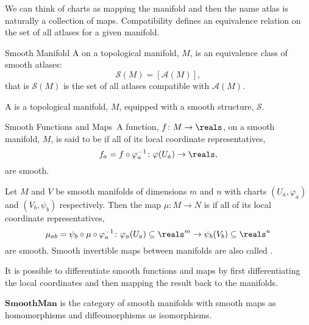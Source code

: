 \documentclass[fleqn]{NotesClass}
\newcommand*{\category}[1]{\mathbf{#1}}
\begin{document}
    We can think of charts as mapping the manifold and then the name atlas is naturally a collection of maps.
    Compatibility defines an equivalence relation on the set of all atlases for a given manifold.
    
    \begin{dfn}{Smooth Manifold}{}
        A  on a topological manifold, \(M\), is an equivalence class of smooth atlases:
        \begin{equation}
            \mathcal{S}(M) = [\mathcal{A}(M)],
        \end{equation}
        that is \(\mathcal{S}(M)\) is the set of all atlases compatible with \(\mathcal{A}(M)\).
        
        A  is a topological manifold, \(M\), equipped with a smooth structure, \(\mathcal{S}\).
    \end{dfn}
    
    \begin{dfn}{Smooth Functions and Maps}{}\
        A function, \(f \colon M \to \reals\), on a smooth manifold, \(M\), is said to be  if all of its local coordinate representatives, 
        \begin{equation}
            f_a = f \circ \varphi_a^{-1} \colon \varphi(U_a) \to \reals,
        \end{equation}
        are smooth.
        
        Let \(M\) and \(V\) be smooth manifolds of dimensions \(m\) and \(n\) with charts \((U_a, \varphi_a)\) and \((V_b, \psi_b)\) respectively.
        Then the map \(\mu \colon M \to N\) is \define{smooth}\index{smooth!map} if all of its local coordinate representatives,
        \begin{equation}
            \mu_{ab} = \psi_b \circ \mu \circ \varphi_a^{-1} \colon \varphi_a(U_a) \subseteq \reals^m \to \psi_b(V_b) \subseteq \reals^n
        \end{equation}
        are smooth.
        Smooth invertible maps between manifolds are also called .
    \end{dfn}
    
    It is possible to differentiate smooth functions and maps by first differentiating the local coordinates and then mapping the result back to the manifolds.
    
    \(\category{SmoothMan}\) is the category of smooth manifolds with smooth maps as homomorphisms and diffeomorphisms as isomorphisms.
    
\end{document}
